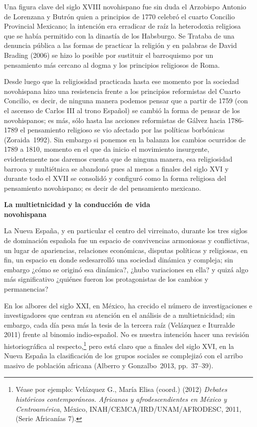 Una figura clave del siglo XVIII novohispano fue sin duda el Arzobispo Antonio
de Lorenzana y Butrón quien a principios de 1770 celebró el cuarto Concilio
Provincial Mexicano; la intención era erradicar de raíz la heterodoxia
religiosa que se había permitido con la dinastía de los Habsburgo. Se Trataba
de una denuncia pública  a las formas de practicar la religión  y en palabras
de David Brading (2006)  se hizo lo posible por sustituir el barroquismo por un
pensamiento más cercano al dogma y los principios religiosos de Roma.


Desde luego que la religiosidad practicada hasta ese momento por la sociedad
novohispana hizo una resistencia frente a los principios reformistas del Cuarto
Concilio, es decir, de ninguna manera podemos pensar que a partir de 1759  (con
el ascenso de Carlos III al trono Español) se cambió la forma de pensar de los
novohispanos; es más, sólo hasta las acciones reformistas de Gálvez hacia
1786-1789 el pensamiento religioso se vio afectado por las políticas borbónicas
(Zoraida~1992). Sin embargo si ponemos en la balanza los cambios ocurridos de
1789 a 1810, momento en el que da inicio el movimiento insurgente,
evidentemente nos daremos cuenta que de ninguna manera, esa religiosidad
barroca y multiétnica se abandonó pues al menos a finales del siglo XVI y
durante todo el XVII se consolidó y configuró como la forma religiosa del
pensamiento novohispano; es decir de del pensamiento mexicano.


\medskip
\textbf{La multietnicidad y la conducción de vida\\ novohispana}

La Nueva España, y en particular el centro del virreinato, durante los tres
siglos de dominación española fue un espacio de convivencias armoniosas y
conflictivas, un lugar de apariencias, relaciones económicas, disputas
políticas y religiosas, en fin, un espacio en donde se\linebreak desarrolló una sociedad
dinámica y compleja; sin embargo ¿cómo se originó esa dinámica?, ¿hubo
variaciones en ella? y quizá algo más significativo ¿quiénes fueron los
protagonistas de los cambios y permanencias?


En los albores del siglo XXI, en México, ha crecido el número de investigaciones
e investigadores que centran su atención en el análisis de a multietnicidad;
sin embargo, cada día pesa más la tesis de la tercera raíz (Velázquez e
Iturralde 2011) frente al binomio indio-español. No es nuestra intención hacer
una revisión historiográfica al respecto,\footnote{ Véase por ejemplo: Velázquez
G., María Elisa (coord.) (2012) \textit{Debates históricos contemporáneos.
Africanos y afrodescendientes  en México y Centroamérica}, México,
INAH/CEMCA/IRD/UNAM/AFRODESC, 2011, (Serie Africanías 7).} pero está claro  que
a finales del siglo XVI, en la Nueva España la clasificación de los grupos
sociales se complejizó con el arribo masivo de población africana (Alberro y
Gonzalbo~2013, pp.~37--39).


